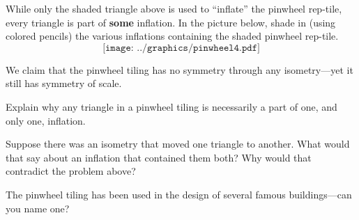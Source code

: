 \begin{prob}
While only the shaded triangle above is used to ``inflate'' the
pinwheel rep-tile, every triangle is part of \textbf{some}
inflation. In the picture below, shade in (using colored pencils) the
various inflations containing the shaded pinwheel rep-tile.
\[
\texttt{[image: ../graphics/pinwheel4.pdf]}
\]
\end{prob}


\break

We claim that the pinwheel tiling has no symmetry through any
isometry---yet it still has symmetry of scale.


\begin{prob}
Explain why any triangle in a pinwheel tiling is necessarily a part of
one, and only one, inflation.
\end{prob}


\begin{prob}
Suppose there was an isometry that moved one triangle to another. What
would that say about an inflation that contained them both? Why would
that contradict the problem above?
\end{prob}


\begin{prob}
The pinwheel tiling has been used in the design of several famous
buildings---can you name one?
\end{prob}
